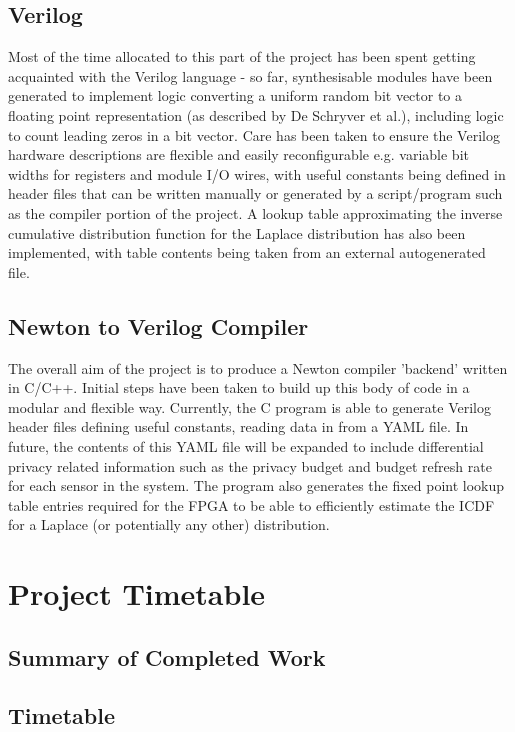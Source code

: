 \documentclass[pageno]{jpaper}
\begin{document}
\subsection{Verilog}
Most of the time allocated to this part of the project has been spent getting acquainted with the Verilog language - so far, synthesisable modules have been generated to implement logic converting a uniform random bit vector to a floating point representation (as described by De Schryver et al.\cite{DeSchryver}), including logic to count leading zeros in a bit vector. Care has been taken to ensure the Verilog hardware descriptions are flexible and easily reconfigurable e.g. variable bit widths for registers and module I/O wires, with useful constants being defined in header files that can be written manually or generated by a script/program such as the compiler portion of the project. A lookup table approximating the inverse cumulative distribution function for the Laplace distribution has also been implemented, with table contents being taken from an external autogenerated file.

\subsection{Newton to Verilog Compiler}
The overall aim of the project is to produce a Newton compiler 'backend' written in C/C++. Initial steps have been taken to build up this body of code in a modular and flexible way. Currently, the C program is able to generate Verilog header files defining useful constants, reading data in from a YAML file. In future, the contents of this YAML file will be expanded to include differential privacy related information such as the privacy budget and budget refresh rate for each sensor in the system. The program also generates the fixed point lookup table entries required for the FPGA to be able to efficiently estimate the ICDF for a Laplace (or potentially any other) distribution.

\section{Project Timetable}
\subsection{Summary of Completed Work}
\subsection{Timetable}
\end{document}
